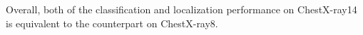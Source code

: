 \documentclass[10pt,twocolumn,letterpaper]{article}
\begin{document}

Overall, both of the classification and localization performance on ChestX-ray14 is equivalent to the counterpart on ChestX-ray8. %
\end{document}
